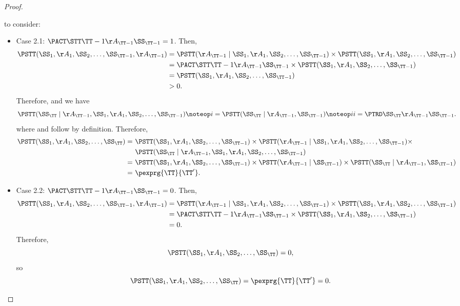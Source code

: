 \begin{proof}
\begin{itemize}
       to consider:
      \begin{itemize}
        \item Case 2.1: $\isact = 1$.
          Then,
          \begin{align*}
            \ismid &= \isbf \times \isa\\
                   &= \isact \times \isa\\
                   &= \isa\\
                   &> 0.
          \end{align*}
          Therefore, 
          and we have
          $$\iscf \noteop i = \isc \noteop ii = \istrd.$$
          where  and 
           follow by definition.
          Therefore,
          \begin{align*}
            \isjoint =\ & \isa \times \isbf \times\\& \iscf\\
            =\ & \isa \times \isb \times \isc\\
            =\ & \pexprg{\TT}{\TT'}.
          \end{align*}

        \item Case 2.2: $\isact = 0$.
          Then,
          \begin{align*}
            \ismid &= \isbf \times \isa\\
                   &= \isact \times \isa\\
                   &= 0.
          \end{align*}
          Therefore,
          $$\isjoint = 0,$$
          so
          $$\isjoint = \pexprg{\TT}{\TT'} = 0.$$
      \end{itemize}
  \end{itemize}
\end{proof}
